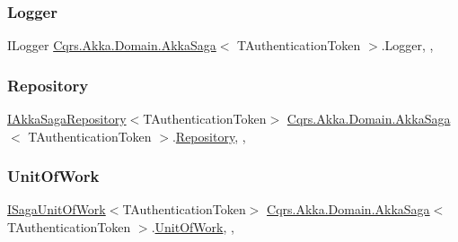 \subsubsection{\texorpdfstring{Logger}{Logger}}
{\footnotesize\ttfamily I\+Logger \hyperlink{classCqrs_1_1Akka_1_1Domain_1_1AkkaSaga}{Cqrs.\+Akka.\+Domain.\+Akka\+Saga}$<$ T\+Authentication\+Token $>$.Logger\hspace{0.3cm}{\ttfamily [get]}, {\ttfamily [set]}, {\ttfamily [protected]}}

\mbox{\label{classCqrs_1_1Akka_1_1Domain_1_1AkkaSaga_a4c0662a1aa78c8de5fa32c71a54cf393}} 
\subsubsection{\texorpdfstring{Repository}{Repository}}
{\footnotesize\ttfamily \hyperlink{interfaceCqrs_1_1Akka_1_1Domain_1_1IAkkaSagaRepository}{I\+Akka\+Saga\+Repository}$<$T\+Authentication\+Token$>$ \hyperlink{classCqrs_1_1Akka_1_1Domain_1_1AkkaSaga}{Cqrs.\+Akka.\+Domain.\+Akka\+Saga}$<$ T\+Authentication\+Token $>$.\hyperlink{classCqrs_1_1Domain_1_1Repository}{Repository}\hspace{0.3cm}{\ttfamily [get]}, {\ttfamily [set]}, {\ttfamily [protected]}}

\mbox{\label{classCqrs_1_1Akka_1_1Domain_1_1AkkaSaga_addbf93da18d577da8f8f1e2dba5cafb9}} 
\subsubsection{\texorpdfstring{Unit\+Of\+Work}{UnitOfWork}}
{\footnotesize\ttfamily \hyperlink{interfaceCqrs_1_1Domain_1_1ISagaUnitOfWork}{I\+Saga\+Unit\+Of\+Work}$<$T\+Authentication\+Token$>$ \hyperlink{classCqrs_1_1Akka_1_1Domain_1_1AkkaSaga}{Cqrs.\+Akka.\+Domain.\+Akka\+Saga}$<$ T\+Authentication\+Token $>$.\hyperlink{classCqrs_1_1Domain_1_1UnitOfWork}{Unit\+Of\+Work}\hspace{0.3cm}{\ttfamily [get]}, {\ttfamily [set]}, {\ttfamily [protected]}}

